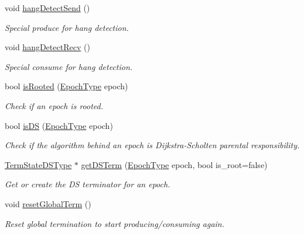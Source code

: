 \begin{DoxyCompactItemize}
void \hyperlink{structvt_1_1term_1_1_termination_detector_ad863add6716d920778eef1298016a0ea}{hang\+Detect\+Send} ()
\begin{DoxyCompactList}\small\item\em Special produce for hang detection. \end{DoxyCompactList}\item 
void \hyperlink{structvt_1_1term_1_1_termination_detector_ad9b79c662481216d0bb70f81b12dfbf8}{hang\+Detect\+Recv} ()
\begin{DoxyCompactList}\small\item\em Special consume for hang detection. \end{DoxyCompactList}\item 
bool \hyperlink{structvt_1_1term_1_1_termination_detector_ad95b226357b77e29c415627bbca4e798}{is\+Rooted} (\hyperlink{namespacevt_a81d11b28122d43bf9834577e4a06440f}{Epoch\+Type} epoch)
\begin{DoxyCompactList}\small\item\em Check if an epoch is rooted. \end{DoxyCompactList}\item 
bool \hyperlink{structvt_1_1term_1_1_termination_detector_a3ab6ba4618093384b6ddd6c0607df543}{is\+DS} (\hyperlink{namespacevt_a81d11b28122d43bf9834577e4a06440f}{Epoch\+Type} epoch)
\begin{DoxyCompactList}\small\item\em Check if the algorithm behind an epoch is Dijkstra-\/\+Scholten parental responsibility. \end{DoxyCompactList}\item 
\hyperlink{structvt_1_1term_1_1_termination_detector_aa96c37b5c120063060c6418c48e64bd1}{Term\+State\+D\+S\+Type} $\ast$ \hyperlink{structvt_1_1term_1_1_termination_detector_a546a48949da827a98dea2cfaffeddb91}{get\+D\+S\+Term} (\hyperlink{namespacevt_a81d11b28122d43bf9834577e4a06440f}{Epoch\+Type} epoch, bool is\+\_\+root=false)
\begin{DoxyCompactList}\small\item\em Get or create the DS terminator for an epoch. \end{DoxyCompactList}\item 
void \hyperlink{structvt_1_1term_1_1_termination_detector_a756e767b99e869966247c9198403afb6}{reset\+Global\+Term} ()
\begin{DoxyCompactList}\small\item\em Reset global termination to start producing/consuming again. \end{DoxyCompactList}\item 

\end{DoxyCompactItemize}
